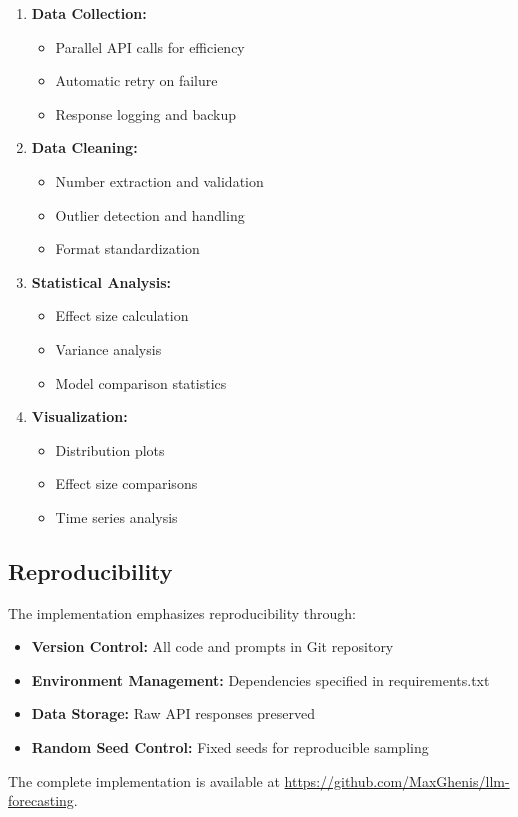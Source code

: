 \begin{enumerate}
    \item \textbf{Data Collection:}
    \begin{itemize}
        \item Parallel API calls for efficiency
        \item Automatic retry on failure
        \item Response logging and backup
    \end{itemize}
    
    \item \textbf{Data Cleaning:}
    \begin{itemize}
        \item Number extraction and validation
        \item Outlier detection and handling
        \item Format standardization
    \end{itemize}
    
    \item \textbf{Statistical Analysis:}
    \begin{itemize}
        \item Effect size calculation
        \item Variance analysis
        \item Model comparison statistics
    \end{itemize}
    
    \item \textbf{Visualization:}
    \begin{itemize}
        \item Distribution plots
        \item Effect size comparisons
        \item Time series analysis
    \end{itemize}
\end{enumerate}

\subsection{Reproducibility}

The implementation emphasizes reproducibility through:

\begin{itemize}
    \item \textbf{Version Control:} All code and prompts in Git repository
    \item \textbf{Environment Management:} Dependencies specified in requirements.txt
    \item \textbf{Data Storage:} Raw API responses preserved
    \item \textbf{Random Seed Control:} Fixed seeds for reproducible sampling
\end{itemize}

The complete implementation is available at \url{https://github.com/MaxGhenis/llm-forecasting}.